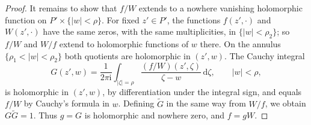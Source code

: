 \begin{proof}
It remains to show that $f/W$ extends to a nowhere vanishing holomorphic function on $P'\times\{|w|<\rho\}$. For fixed $z'\in P'$, the functions $f(z',\cdot)$ and $W(z',\cdot)$ have the same zeros, with the same multiplicities, in $\{|w|<\rho_2\}$; so $f/W$ and $W/f$ extend to holomorphic functions of $w$ there. On the annulus $\{\rho_1<|w|<\rho_2\}$ both quotients are holomorphic in $(z',w)$. The Cauchy integral
\[
 G(z',w)=\frac{1}{2\pi\mathrm i}\int_{|\zeta|=\rho}\frac{(f/W)(z',\zeta)}{\zeta-w}\,\mathrm d\zeta,\qquad|w|<\rho,
\]
is holomorphic in $(z',w)$, by differentiation under the integral sign, and equals $f/W$ by Cauchy's formula in $w$. Defining $\widetilde G$ in the same way from $W/f$, we obtain $G\widetilde G=1$. Thus $g=G$ is holomorphic and nowhere zero, and $f=gW$.
\end{proof}

